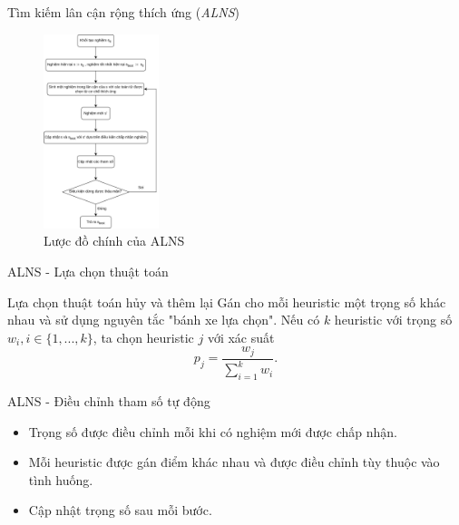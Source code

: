 \begin{frame}{Tìm kiếm lân cận rộng thích ứng (\textit{ALNS})}
  \begin{figure}[H] %
    \centering %
    \includegraphics[width=0.3\textwidth]{figures/ALNS-flowchart.png} 
    \caption{Lược đồ chính của ALNS} 
  \end{figure}
\end{frame}

\begin{frame}{ALNS - Lựa chọn thuật toán}
  \begin{block}{Lựa chọn thuật toán hủy và thêm lại}
    Gán cho mỗi heuristic một trọng số khác nhau và sử dụng nguyên tắc "bánh xe lựa chọn". Nếu có $k$ heuristic với trọng số $w_i, i \in \{1,...,k\}$, ta chọn heuristic $j$ với xác suất
    \begin{equation}
      \label{eq:select}
      p_j = \frac{w_j}{\sum_{i=1}^k w_i}.
    \end{equation}
  \end{block}
\end{frame}

\begin{frame}{ALNS - Điều chỉnh tham số tự động}
  \begin{itemize}
    \item Trọng số được điều chỉnh mỗi khi có nghiệm mới được chấp nhận.
    \item Mỗi heuristic được gán điểm khác nhau và được điều chỉnh tùy thuộc vào tình huống.
    \item Cập nhật trọng số sau mỗi bước.
  \end{itemize}
\end{frame}

